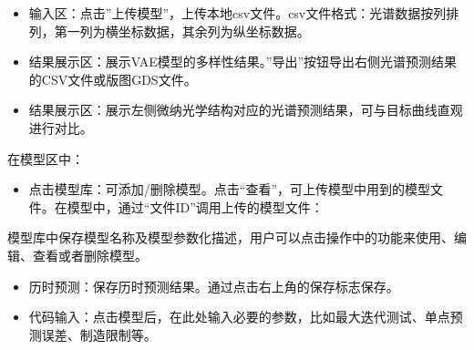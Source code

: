 \documentclass[letterpaper,10pt,english]{sphinxmanual}
\begin{document}
{{{{\begin{itemize}
\item {} 
\sphinxAtStartPar
输入区：点击”上传模型”，上传本地csv文件。csv文件格式：光谱数据按列排列，第一列为横坐标数据，其余列为纵坐标数据。

\item {} 
\sphinxAtStartPar
结果展示区：展示VAE模型的多样性结果。”导出”按钮导出右侧光谱预测结果的CSV文件或版图GDS文件。

\item {} 
\sphinxAtStartPar
结果展示区：展示左侧微纳光学结构对应的光谱预测结果，可与目标曲线直观进行对比。

\end{itemize}

\sphinxAtStartPar
{}



\sphinxAtStartPar
在模型区中：
\begin{itemize}
\item {} 
\sphinxAtStartPar
点击模型库：可添加/删除模型。点击“查看”，可上传模型中用到的模型文件。在模型中，通过“文件ID”调用上传的模型文件：

\end{itemize}

\begin{sphinxVerbatim}[commandchars=\\\{\}]
  
  
\end{sphinxVerbatim}

\sphinxAtStartPar
模型库中保存模型名称及模型参数化描述，用户可以点击操作中的功能来使用、编辑、查看或者删除模型。


\begin{itemize}
\item {} 
\sphinxAtStartPar
历时预测：保存历时预测结果。通过点击右上角的保存标志保存。

\item {} 
\sphinxAtStartPar
代码输入：点击模型后，在此处输入必要的参数，比如最大迭代测试、单点预测误差、制造限制等。


\end{itemize}}}}}
\end{document}
